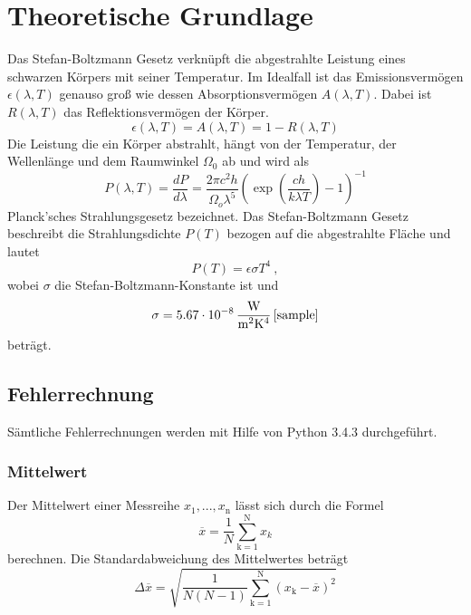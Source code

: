 \section{Theoretische Grundlage}
\label{sec:Theorie}
Das Stefan-Boltzmann Gesetz verknüpft die abgestrahlte Leistung eines schwarzen Körpers mit seiner Temperatur. Im Idealfall ist das Emissionsvermögen $\epsilon(\lambda, T)$ genauso groß wie dessen Absorptionsvermögen $A(\lambda, T)$. Dabei ist $R(\lambda,T)$ das Reflektionsvermögen der Körper.
\begin{equation}
  \epsilon(\lambda, T) = A(\lambda, T) = 1-R(\lambda, T)
  \label{eqn:emission}
\end{equation}
Die Leistung die ein Körper abstrahlt, hängt von der Temperatur, der Wellenlänge und dem Raumwinkel $\Omega_0$ ab und wird als
\begin{equation}
  P(\lambda, T) = \frac{dP}{d \lambda} = \frac{2 \pi c^2 h}{\Omega_o \lambda^5}\left( \exp \left( \frac{c h}{k \lambda T} \right) -1 \right)^{-1}
  \label{eqn:planck}
\end{equation}
Planck'sches Strahlungsgesetz bezeichnet.
Das Stefan-Boltzmann Gesetz beschreibt die Strahlungsdichte $P(T)$ bezogen auf die abgestrahlte Fläche und lautet
\begin{equation}
  P(T) = \epsilon \sigma T^4 \ ,
  \label{eqn:strahlungsgesetz}
\end{equation}
wobei $\sigma$ die Stefan-Boltzmann-Konstante ist und
\begin{equation}
  \sigma = 5.67 \cdot 10^{-8} \, \frac{\text{W}}{\text{m$^2$K$^4$}} \, \text{\cite{sample}}
\end{equation}
beträgt.
\subsection{Fehlerrechnung}
Sämtliche Fehlerrechnungen werden mit Hilfe von Python 3.4.3 durchgeführt.
\subsubsection{Mittelwert}
Der Mittelwert einer Messreihe $x_\text{1}, ... ,x_\text{n}$ lässt sich durch die Formel
\begin{equation}
	\overline{x} = \frac{1}{N} \sum_{\text{k}=1}^\text{N} x_k
	\label{eqn:ave}
\end{equation}
berechnen. Die Standardabweichung des Mittelwertes beträgt
\begin{equation}
	\Delta \overline{x} = \sqrt{ \frac{1}{N(N-1)} \sum_{\text{k}=1}^\text{N} (x_\text{k} - \overline{x})^2}
	\label{eqn:std}
\end{equation}
